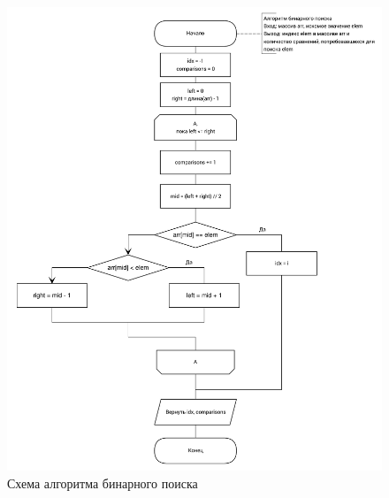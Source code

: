 \begin{figure}[!htb]
\centering
\includegraphics[width=\textwidth]{inc/img/binary_search.pdf}
\caption{Схема алгоритма бинарного поиска}
\label{fig:binary_search}
\end{figure}
